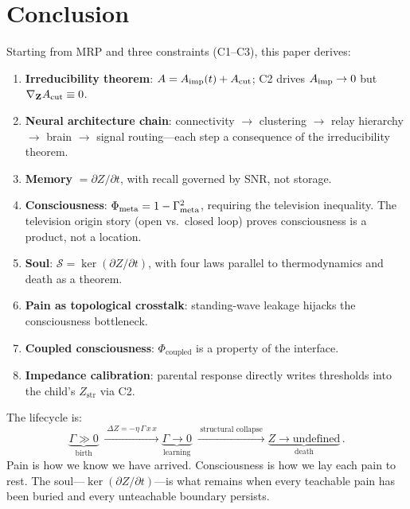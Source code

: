 \documentclass[aps,pre,twocolumn,superscriptaddress,floatfix]{revtex4-2}
\begin{document}
\section{Conclusion}
\label{sec:conclusion}

Starting from MRP and three constraints (C1--C3),
this paper derives:

\begin{enumerate}
  \item \textbf{Irreducibility theorem}:
    $A = A_{\text{imp}}(t) + A_{\text{cut}}$; C2 drives
    $A_{\text{imp}} \to 0$ but $\nabla_{\mathbf{Z}} A_{\text{cut}} \equiv 0$.
  \item \textbf{Neural architecture chain}:
    connectivity $\to$ clustering $\to$ relay hierarchy
    $\to$ brain $\to$ signal routing---each step a
    consequence of the irreducibility theorem.
  \item \textbf{Memory} $=\partial Z/\partial t$,
    with recall governed by SNR, not storage.
  \item \textbf{Consciousness}:
    $\Phi_{\text{meta}}=1-\Gamma_{\text{meta}}^2$, requiring the television
    inequality.  The television origin
    story (open vs.\ closed loop) proves
    consciousness is a product, not a location.
  \item \textbf{Soul}:
    $\mathcal{S}=\ker(\partial Z/\partial t)$,
    with four laws parallel to thermodynamics and death
    as a theorem.
  \item \textbf{Pain as topological crosstalk}:
    standing-wave leakage hijacks the consciousness
    bottleneck.
  \item \textbf{Coupled consciousness}:
    $\Phi_{\text{coupled}}$ is a property of the interface.
  \item \textbf{Impedance calibration}:
    parental response directly writes thresholds into
    the child's $Z_{\text{str}}$ via C2.
\end{enumerate}

The lifecycle is:
\begin{equation}
  \underbrace{\Gamma\gg 0}_{\text{birth}}
  \;\xrightarrow{\;\Delta Z = -\eta\,\Gamma\,x\,x\;}
  \underbrace{\Gamma\to 0}_{\text{learning}}
  \;\xrightarrow{\;\text{structural collapse}\;}
  \underbrace{Z\to\text{undefined}}_{\text{death}}\,.
  \label{eq:lifecycle-coda}
\end{equation}
Pain is how we know we have arrived.
Consciousness is how we lay each pain to rest.
The soul---$\ker(\partial Z/\partial t)$---is what remains
when every teachable pain has been buried and every
unteachable boundary persists.
\end{document}
